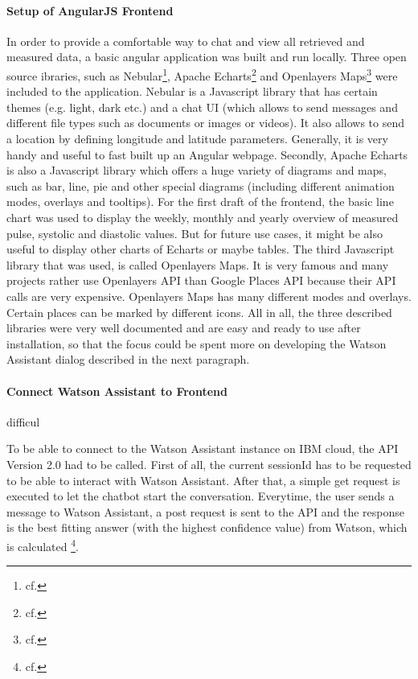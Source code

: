 \paragraph{Setup of AngularJS Frontend}
In order to provide a comfortable way to chat and view all retrieved and measured data, a basic angular application was built and run locally. Three open source ibraries, such as Nebular\footnote{cf.\autocite{nebular}}, Apache Echarts\footnote{cf.\autocite{echarts}} and Openlayers Maps\footnote{cf.\autocite{openlayers}} were included to the application. Nebular is a Javascript library that has certain themes (e.g. light, dark etc.) and a chat UI (which allows to send messages and different file types such as documents or images or videos). It also allows to send a location by defining longitude and latitude parameters. Generally, it is very handy and useful to fast built up an Angular webpage.
Secondly, Apache Echarts is also a Javascript library which offers a huge variety of diagrams and maps, such as bar, line, pie and other special diagrams (including different animation modes, overlays and tooltips). For the first draft of the frontend, the basic line chart was used to display the weekly, monthly and yearly overview of measured pulse, systolic and diastolic values. But for future use cases, it might be also useful to display other charts of Echarts or maybe tables.
The third Javascript library that was used, is called Openlayers Maps. It is very famous and many projects rather use Openlayers API than Google Places API because their API calls are very expensive. Openlayers Maps has many different modes and overlays. Certain places can be marked by different icons.
All in all, the three described libraries were very well documented and are easy and ready to use after installation, so that the focus could be spent more on developing the Watson Assistant dialog described in the next paragraph.

\paragraph{Connect Watson Assistant to Frontend}

difficul

To be able to connect to the Watson Assistant instance on IBM cloud, the API Version 2.0 had to be called. First of all, the current sessionId has to be requested to be able to interact with Watson Assistant. After that, a simple get request is executed to let the chatbot start the conversation. Everytime, the user sends a message to Watson Assistant, a post request is sent to the API and the response is the best fitting answer (with the highest confidence value) from Watson, which is calculated \footnote{cf.\autocite{wa_api_v2}}.

